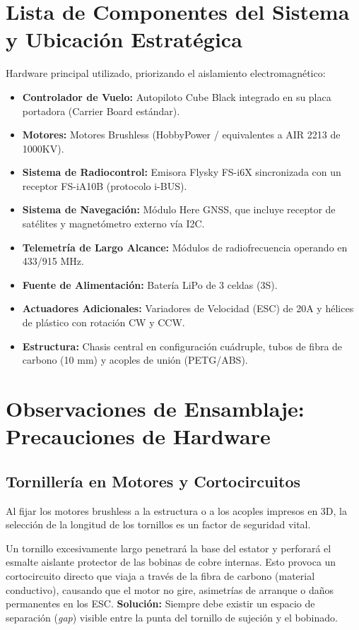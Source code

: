 \documentclass[11pt,a4paper]{article}
\begin{document}
\section{Lista de Componentes del Sistema y Ubicación Estratégica}
Hardware principal utilizado, priorizando el aislamiento electromagnético:
\begin{itemize}[leftmargin=*,noitemsep]
    \item \textbf{Controlador de Vuelo:} Autopiloto Cube Black integrado en su placa portadora (Carrier Board estándar).
    \item \textbf{Motores:} Motores Brushless (HobbyPower / equivalentes a AIR 2213 de 1000KV). 
    \item \textbf{Sistema de Radiocontrol:} Emisora Flysky FS-i6X sincronizada con un receptor FS-iA10B (protocolo i-BUS).
    \item \textbf{Sistema de Navegación:} Módulo Here GNSS, que incluye receptor de satélites y magnetómetro externo vía I2C.
    \item \textbf{Telemetría de Largo Alcance:} Módulos de radiofrecuencia operando en 433/915 MHz.
    \item \textbf{Fuente de Alimentación:} Batería LiPo de 3 celdas (3S).
    \item \textbf{Actuadores Adicionales:} Variadores de Velocidad (ESC) de 20A y hélices de plástico con rotación CW y CCW.
    \item \textbf{Estructura:} Chasis central en configuración cuádruple, tubos de fibra de carbono (10 mm) y acoples de unión (PETG/ABS).
\end{itemize}

\section{Observaciones de Ensamblaje: Precauciones de Hardware}

\subsection{Tornillería en Motores y Cortocircuitos}
Al fijar los motores brushless a la estructura o a los acoples impresos en 3D, la selección de la longitud de los tornillos es un factor de seguridad vital.

\begin{warningbox}[title=El Problema de los Cortocircuitos]
Un tornillo excesivamente largo penetrará la base del estator y perforará el esmalte aislante protector de las bobinas de cobre internas. Esto provoca un cortocircuito directo que viaja a través de la fibra de carbono (material conductivo), causando que el motor no gire, asimetrías de arranque o daños permanentes en los ESC. \textbf{Solución:} Siempre debe existir un espacio de separación (\textit{gap}) visible entre la punta del tornillo de sujeción y el bobinado.
\end{warningbox}
\end{document}
